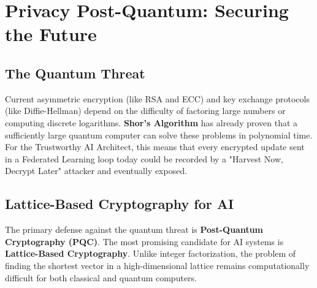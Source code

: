 
\chapter{Privacy Post-Quantum: Securing the Future}
\label{chap:post_quantum}


\section{The Quantum Threat}
\label{sec:quantum_threat}

Current asymmetric encryption (like RSA and ECC) and key exchange protocols (like Diffie-Hellman) depend on the difficulty of factoring large numbers or computing discrete logarithms. \textbf{Shor's Algorithm} has already proven that a sufficiently large quantum computer can solve these problems in polynomial time. For the Trustworthy AI Architect, this means that every encrypted update sent in a Federated Learning loop today could be recorded by a "Harvest Now, Decrypt Later" attacker and eventually exposed.

\section{Lattice-Based Cryptography for AI}
\label{sec:lattice_crypto}

The primary defense against the quantum threat is \textbf{Post-Quantum Cryptography (PQC)}. The most promising candidate for AI systems is \textbf{Lattice-Based Cryptography}. Unlike integer factorization, the problem of finding the shortest vector in a high-dimensional lattice remains computationally difficult for both classical and quantum computers.

